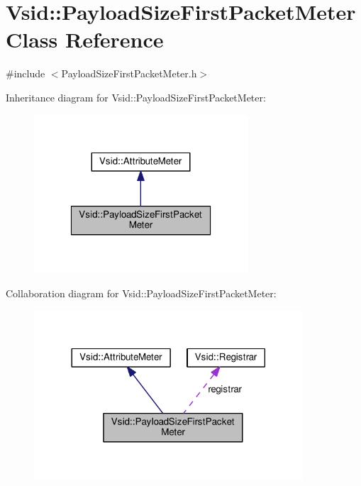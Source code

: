 \hypertarget{class_vsid_1_1_payload_size_first_packet_meter}{\section{Vsid\-:\-:Payload\-Size\-First\-Packet\-Meter Class Reference}
\label{class_vsid_1_1_payload_size_first_packet_meter}
}


{\ttfamily \#include $<$Payload\-Size\-First\-Packet\-Meter.\-h$>$}



Inheritance diagram for Vsid\-:\-:Payload\-Size\-First\-Packet\-Meter\-:
\nopagebreak
\begin{figure}[H]
\begin{center}
\leavevmode
\includegraphics[width=226pt]{class_vsid_1_1_payload_size_first_packet_meter__inherit__graph}
\end{center}
\end{figure}


Collaboration diagram for Vsid\-:\-:Payload\-Size\-First\-Packet\-Meter\-:
\nopagebreak
\begin{figure}[H]
\begin{center}
\leavevmode
\includegraphics[width=284pt]{class_vsid_1_1_payload_size_first_packet_meter__coll__graph}
\end{center}
\end{figure}

